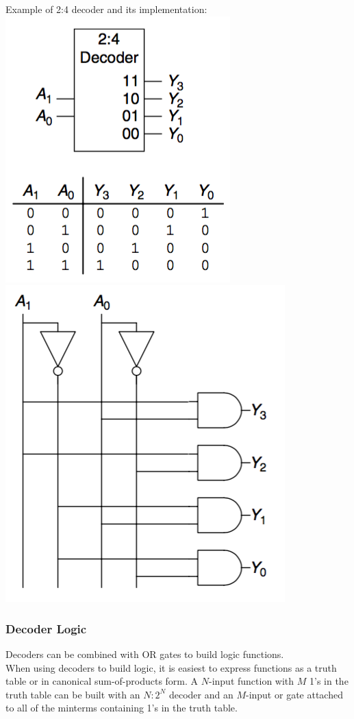 \documentclass[12pt]{article}
\theoremstyle{definition}
\begin{document}
  Example of 2:4 decoder and its implementation: \\
  \includegraphics{pictures/2_4_decoder.png}
  \includegraphics{pictures/2_4_decoder_implementation.png} \\

  \subsubsection{Decoder Logic}
  Decoders can be combined with OR gates to build logic functions. \\
  When using decoders to build logic, it is easiest to express functions as a truth table or in canonical sum-of-products form.
  A $N$-input function with $M$ 1's in the truth table can be built with an $N:2^{N}$ decoder and an $M$-input or gate attached to all of the minterms containing 1's in the truth table.
\end{document}
